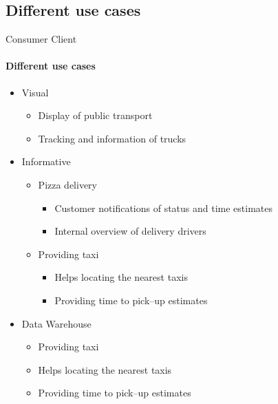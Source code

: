 \subsection{Different use cases}

\begin{frame}{Consumer Client}
    \framesubtitle{Different use cases}
    \begin{itemize}
        \item<1-> Visual
        \begin{itemize}
            \item<2-> Display of public transport
            \item<2-> Tracking and information of trucks
        \end{itemize}

        \item<1-> Informative
        \begin{itemize}
            \item<3-> Pizza delivery
            \begin{itemize}
                \item<3-> Customer notifications of status and time estimates
                \item<3-> Internal overview of delivery drivers
            \end{itemize}
            \item<4-> Providing taxi
            \begin{itemize}
                \item<4-> Helps locating the nearest taxis
                \item<4-> Providing time to pick--up estimates
            \end{itemize}
        \end{itemize}

        \item<1-> Data Warehouse
        \begin{itemize}
            \item<5-> Providing taxi
            \item<5-> Helps locating the nearest taxis
            \item<5-> Providing time to pick--up estimates
        \end{itemize}
    \end{itemize}



\end{frame}
